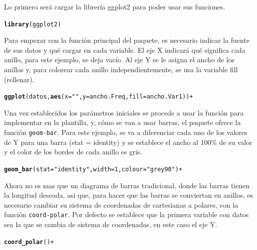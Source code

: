 \documentclass{article}\usepackage[]{graphicx}\usepackage[]{color}
\makeatletter
\newcommand{\hlstr}[1]{\textcolor[rgb]{0.192,0.494,0.8}{#1}}%
\newcommand{\hlstd}[1]{\textcolor[rgb]{0.345,0.345,0.345}{#1}}%
\newcommand{\hlkwd}[1]{\textcolor[rgb]{0.737,0.353,0.396}{\textbf{#1}}}%
\newenvironment{kframe}{%
 \def\at@end@of@kframe{}%
 \ifinner\ifhmode%
  \def\at@end@of@kframe{\end{minipage}}%
  \begin{minipage}{\columnwidth}%
 \fi\fi%
 \def\FrameCommand##1{\hskip\@totalleftmargin \hskip-\fboxsep
 \colorbox{shadecolor}{##1}\hskip-\fboxsep
     \hskip-\linewidth \hskip-\@totalleftmargin \hskip\columnwidth}%
 \MakeFramed {\advance\hsize-\width
   \@totalleftmargin\z@ \linewidth\hsize
   \@setminipage}}%
 {\par\unskip\endMakeFramed%
 \at@end@of@kframe}
\newenvironment{knitrout}{}{} %
\makeatother
\begin{document}
Lo primero ser\'a cargar la librer\'ia ggplot2 para poder usar sus funciones.
\begin{knitrout}
\color{fgcolor}\begin{kframe}
\begin{alltt}
\hlkwd{library}\hlstd{(ggplot2)}
\end{alltt}
\end{kframe}
\end{knitrout}
Para empezar con la funci\'on principal del paquete, es necesario indicar la fuente de sus datos y qu\'e cargar en cada variable. El eje X indicar\'a qu\'e significa cada anillo, para este ejemplo, se deja vac\'io. Al eje Y se le asigna el ancho de los anillos y, para colorear cada anillo independientemente, se usa la variable fill (rellenar).
\begin{knitrout}
\color{fgcolor}\begin{kframe}
\begin{alltt}
\hlkwd{ggplot}(datos, \hlkwd{aes}(x=\hlstr{""}, y=ancho.Freq, fill=ancho.Var1)) +
\end{alltt}
\end{kframe}
\end{knitrout}
Una vez establecidos los par\'ametros iniciales se procede a usar la funci\'on para implementar en la plantilla, y, c\'omo se van a usar barras, el paquete ofrece la funci\'on \texttt{geom-bar}. Para este ejemplo, se va a diferenciar cada uno de los valores de Y para una barra (stat = identity) y se establece el ancho al 100\% de su valor y el color de los bordes de cada anillo es gris.
\begin{knitrout}
\color{fgcolor}\begin{kframe}
\begin{alltt}
  \hlkwd{geom_bar}(stat=\hlstr{"identity"}, width=1, colour=\hlstr{"grey90"}) +
\end{alltt}
\end{kframe}
\end{knitrout}
\clearpage
Ahora no es mas que un diagrama de barras tradicional, donde las barras tienen la longitud deseada, asi que, para hacer que las barras se conviertan en anillos, es necesario cambiar su sistema de coordenadas de cartesianas a polares, con la funci\'on \texttt{coord-polar}. Por defecto se establece que la primera variable con datos sea la que se cambia de sistema de coordenadas, en este caso el eje Y.
\begin{knitrout}
\color{fgcolor}\begin{kframe}
\begin{alltt}
  \hlkwd{coord_polar}() +
\end{alltt}
\end{kframe}
\end{knitrout}
\end{document}
